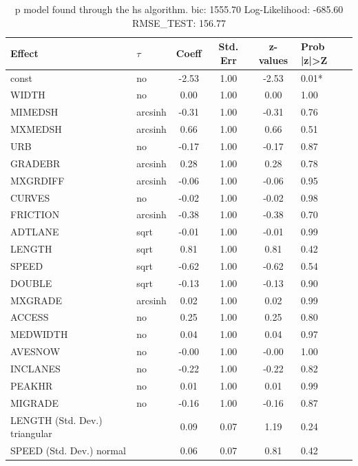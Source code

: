 \begin{table}
	\caption{p model found through the hs algorithm. bic: 1555.70 Log-Likelihood: -685.60 RMSE_TEST: 156.77}
	\begin{center}
		\begin{tabular}{|l|l|c|c|c|l|}
			\hline
			Effect & $\tau$ & Coeff & Std. Err & z-values & Prob |z|>Z \\
			\hline
			const & no & -2.53 & 1.00 & -2.53 & 0.01* \\
			\hline
			WIDTH & no & 0.00 & 1.00 & 0.00 & 1.00 \\
			\hline
			MIMEDSH & arcsinh & -0.31 & 1.00 & -0.31 & 0.76 \\
			\hline
			MXMEDSH & arcsinh & 0.66 & 1.00 & 0.66 & 0.51 \\
			\hline
			URB & no & -0.17 & 1.00 & -0.17 & 0.87 \\
			\hline
			GRADEBR & arcsinh & 0.28 & 1.00 & 0.28 & 0.78 \\
			\hline
			MXGRDIFF & arcsinh & -0.06 & 1.00 & -0.06 & 0.95 \\
			\hline
			CURVES & no & -0.02 & 1.00 & -0.02 & 0.98 \\
			\hline
			FRICTION & arcsinh & -0.38 & 1.00 & -0.38 & 0.70 \\
			\hline
			ADTLANE & sqrt & -0.01 & 1.00 & -0.01 & 0.99 \\
			\hline
			LENGTH & sqrt & 0.81 & 1.00 & 0.81 & 0.42 \\
			\hline
			SPEED & sqrt & -0.62 & 1.00 & -0.62 & 0.54 \\
			\hline
			DOUBLE & sqrt & -0.13 & 1.00 & -0.13 & 0.90 \\
			\hline
			MXGRADE & arcsinh & 0.02 & 1.00 & 0.02 & 0.99 \\
			\hline
			ACCESS & no & 0.25 & 1.00 & 0.25 & 0.80 \\
			\hline
			MEDWIDTH & no & 0.04 & 1.00 & 0.04 & 0.97 \\
			\hline
			AVESNOW & no & -0.00 & 1.00 & -0.00 & 1.00 \\
			\hline
			INCLANES & no & -0.22 & 1.00 & -0.22 & 0.82 \\
			\hline
			PEAKHR & no & 0.01 & 1.00 & 0.01 & 0.99 \\
			\hline
			MIGRADE & no & -0.16 & 1.00 & -0.16 & 0.87 \\
			\hline
			LENGTH (Std. Dev.) triangular &  & 0.09 & 0.07 & 1.19 & 0.24 \\
			\hline
			SPEED (Std. Dev.) normal &  & 0.06 & 0.07 & 0.81 & 0.42 \\

\end{tabular}
\end{center}
\end{table}
